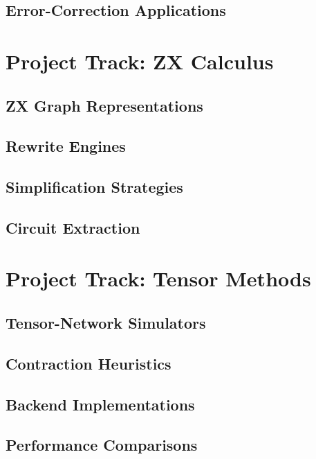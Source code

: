 \documentclass[11pt,a4paper]{article}
\begin{document}
\subsection{Error-Correction Applications}


\section{Project Track: ZX Calculus}

\subsection{ZX Graph Representations}

\subsection{Rewrite Engines}

\subsection{Simplification Strategies}

\subsection{Circuit Extraction}


\section{Project Track: Tensor Methods}

\subsection{Tensor-Network Simulators}

\subsection{Contraction Heuristics}

\subsection{Backend Implementations}

\subsection{Performance Comparisons}
\end{document}
